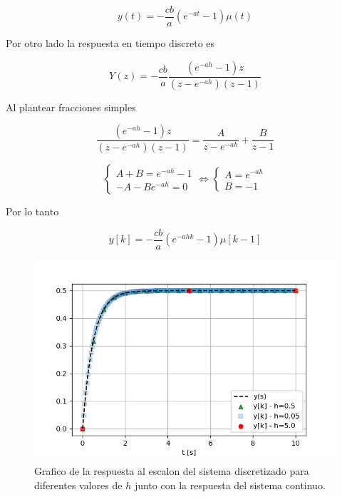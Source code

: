\documentclass{article}
\begin{document}
    \begin{equation}
        y(t) = -\frac{cb}{a} ( e^{-at} - 1 ) \mu(t)
    \end{equation}

    Por otro lado la respuesta en tiempo discreto es 

    \begin{equation}
        Y(z) = -\frac{cb}{a} \frac{(e^{-ah}-1)z}{(z - e^{-ah})(z-1) } 
    \end{equation}

    Al plantear fracciones simples

    \begin{equation}
        \frac{(e^{-ah}-1)z}{(z - e^{-ah})(z-1) } = \frac{A}{z - e^{-ah}} + \frac{B}{z - 1}
    \end{equation}

    \begin{equation}
        \left\{
            \begin{array}{c}
                A + B = e^{-ah} - 1 \\ 
                -A - Be^{-ah} = 0
            \end{array}
        \right.
        \Leftrightarrow
        \left\{
            \begin{array}{c}
                A = e^{-ah} \\ 
                B = -1
            \end{array}
        \right.
    \end{equation}

    Por lo tanto 

    \begin{equation}
        y[k] = -\frac{cb}{a} ( e^{-ahk} - 1 ) \mu[k-1]
    \end{equation}

     \begin{figure}[!htb]
         \centering
         \includegraphics[width=\textwidth]{Img/3-c.png}
         \caption{Grafico de la respuesta al escalon del sistema discretizado para diferentes valores de $h$ junto con la respuesta del sistema continuo.}
         \label{}
     \end{figure}
\end{document}
